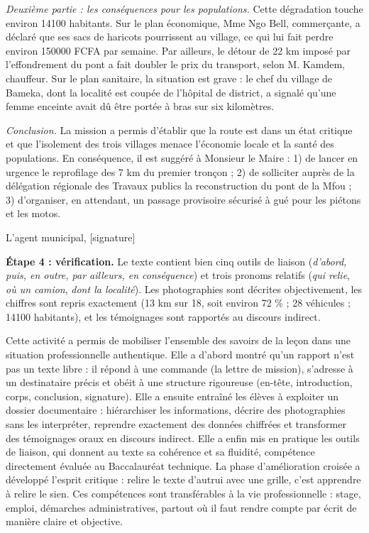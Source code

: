 \documentclass[11pt]{article}
\newcommand{\cle}[1]{{\popxbold\color{popdark}#1}}
\newcounter{popsec}
\newcounter{popsub}
\newcommand{\courssub}[1]{%
  \stepcounter{popsub}%
  \par\vspace{9pt}\noindent{\popxbold\fontsize{11.5}{13}\selectfont\color{popink}{\color{poporange}\thepopsec.\thepopsub}\hspace{6pt}#1}\par\nopagebreak\vspace{4pt}
}
\begin{document}
\begin{exoresolu}
\emph{Deuxième partie : les conséquences pour les populations.} Cette dégradation touche environ \num{14100} habitants. Sur le plan économique, Mme Ngo Bell, commerçante, a déclaré que ses sacs de haricots pourrissent au village, ce qui lui fait perdre environ \num{150000} FCFA par semaine. Par ailleurs, le détour de 22 km imposé par l'effondrement du pont a fait doubler le prix du transport, selon M. Kamdem, chauffeur. Sur le plan sanitaire, la situation est grave : le chef du village de Bameka, dont la localité est coupée de l'hôpital de district, a signalé qu'une femme enceinte avait dû être portée à bras sur six kilomètres.

\emph{Conclusion.} La mission a permis d'établir que la route est dans un état critique et que l'isolement des trois villages menace l'économie locale et la santé des populations. En conséquence, il est suggéré à Monsieur le Maire : 1) de lancer en urgence le reprofilage des 7 km du premier tronçon ; 2) de solliciter auprès de la délégation régionale des Travaux publics la reconstruction du pont de la Mfou ; 3) d'organiser, en attendant, un passage provisoire sécurisé à gué pour les piétons et les motos.\par
L'agent municipal, [signature]

\textbf{Étape 4 : vérification.} Le texte contient bien cinq outils de liaison (\emph{d'abord, puis, en outre, par ailleurs, en conséquence}) et trois pronoms relatifs (\emph{qui relie}, \emph{où un camion}, \emph{dont la localité}). Les photographies sont décrites objectivement, les chiffres sont repris exactement (13 km sur 18, soit environ 72 \% ; 28 véhicules ; \num{14100} habitants), et les témoignages sont rapportés au discours indirect.
\end{exoresolu}

\courssub{Bilan de l'activité}

Cette activité a permis de mobiliser l'ensemble des savoirs de la leçon dans une situation professionnelle authentique. Elle a d'abord montré qu'un rapport n'est pas un texte libre : il répond à une \cle{commande} (la lettre de mission), s'adresse à un destinataire précis et obéit à une structure rigoureuse (en-tête, introduction, corps, conclusion, signature). Elle a ensuite entraîné les élèves à \cle{exploiter un dossier documentaire} : hiérarchiser les informations, décrire des photographies sans les interpréter, reprendre exactement des données chiffrées et transformer des témoignages oraux en discours indirect. Elle a enfin mis en pratique les \cle{outils de liaison}, qui donnent au texte sa cohérence et sa fluidité, compétence directement évaluée au Baccalauréat technique. La phase d'amélioration croisée a développé l'esprit critique : relire le texte d'autrui avec une grille, c'est apprendre à relire le sien. Ces compétences sont transférables à la vie professionnelle : stage, emploi, démarches administratives, partout où il faut rendre compte par écrit de manière claire et objective.
\end{document}
